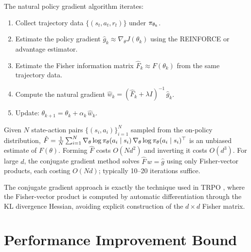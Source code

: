\documentclass[11pt,a4paper]{article}
\begin{document}
\begin{definition}
\label{def:npg-algorithm}
The natural policy gradient algorithm iterates:
\begin{enumerate}[label=\arabic*.]
  \item Collect trajectory data $\{(s_t, a_t, r_t)\}$ under $\pi_{\theta_k}$.
  \item Estimate the policy gradient $\hat{g}_k \approx \nabla_\theta
    J(\theta_k)$ using the REINFORCE or advantage estimator.
  \item Estimate the Fisher information matrix $\hat{F}_k \approx
    F(\theta_k)$ from the same trajectory data.
  \item Compute the natural gradient $\hat{w}_k = (\hat{F}_k +
    \lambda I)^{-1}\, \hat{g}_k$.
  \item Update: $\theta_{k+1} = \theta_k + \alpha_k\, \hat{w}_k$.
\end{enumerate}
\end{definition}

\begin{proposition}
\label{prop:sample-estimates}
Given $N$ state-action pairs $\{(s_i, a_i)\}_{i=1}^N$ sampled from the
on-policy distribution, $\hat{F} = \frac{1}{N} \sum_{i=1}^{N}
\nabla_\theta \log \pi_\theta(a_i \mid s_i)\,
\nabla_\theta \log \pi_\theta(a_i \mid s_i)^\top$ is an unbiased
estimate of $F(\theta)$. Forming $\hat{F}$ costs $O(Nd^2)$ and inverting
it costs $O(d^3)$. For large $d$, the conjugate gradient method solves
$\hat{F}\, w = \hat{g}$ using only Fisher-vector products, each costing
$O(Nd)$; typically 10--20 iterations suffice.
\end{proposition}

\begin{rlconnection}
The conjugate gradient approach is exactly the technique used in TRPO
\citep{schulman2015trpo}, where the Fisher-vector product is computed by
automatic differentiation through the KL divergence Hessian, avoiding
explicit construction of the $d \times d$ Fisher matrix.
\end{rlconnection}

\section{Performance Improvement Bound}
\end{document}
